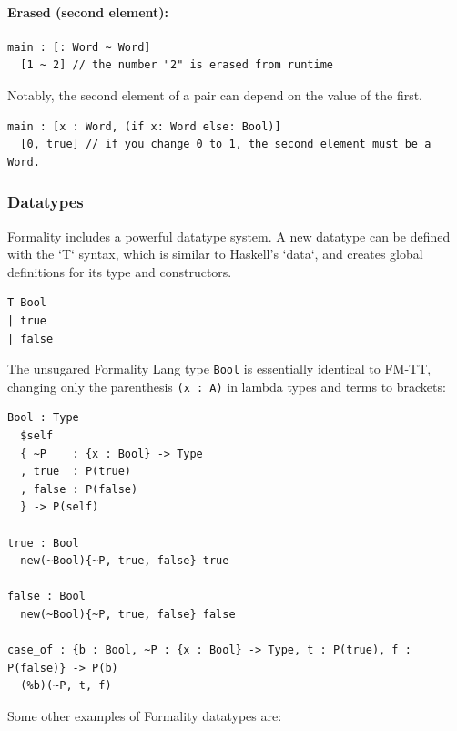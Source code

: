 \documentclass{article}
\theoremstyle{definition}
\theoremstyle{theorem}
\begin{document}
\paragraph{Erased (second element):}

\begin{lstlisting}
main : [: Word ~ Word]
  [1 ~ 2] // the number "2" is erased from runtime
\end{lstlisting}

Notably, the second element of a pair can depend on the value of the first.

\begin{lstlisting}
main : [x : Word, (if x: Word else: Bool)]
  [0, true] // if you change 0 to 1, the second element must be a Word.
\end{lstlisting}


\subsubsection{Datatypes}

Formality includes a powerful datatype system. A new datatype can be defined
with the `T` syntax, which is similar to Haskell's `data`, and creates global
definitions for its type and constructors. 

\begin{lstlisting}
T Bool
| true
| false
\end{lstlisting}

The unsugared Formality Lang type \verb|Bool| is essentially identical to FM-TT,
changing only the parenthesis \verb|(x : A)| in lambda types and terms to
brackets:

\begin{lstlisting}
Bool : Type
  $self
  { ~P    : {x : Bool} -> Type
  , true  : P(true)
  , false : P(false)
  } -> P(self)

true : Bool
  new(~Bool){~P, true, false} true

false : Bool
  new(~Bool){~P, true, false} false

case_of : {b : Bool, ~P : {x : Bool} -> Type, t : P(true), f : P(false)} -> P(b)
  (%b)(~P, t, f)
\end{lstlisting}

Some other examples of Formality datatypes are:
\end{document}
